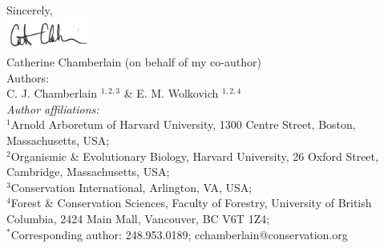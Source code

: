 \documentclass[11pt,a4paper]{article}\usepackage[]{graphicx}\usepackage[]{color}
\begin{document}
\vspace{1.5ex}
\noindent Sincerely, \\
\includegraphics[width=0.2\textwidth]{full_signature.jpg} \\
\noindent Catherine Chamberlain (on behalf of my co-author)
\vspace{2ex}\\
\noindent Authors:\\
C. J. Chamberlain $^{1,2,3}$ \& E. M. Wolkovich $^{1,2,4}$
\vspace{2ex}\\
\emph{Author affiliations:}\\
$^{1}$Arnold Arboretum of Harvard University, 1300 Centre Street, Boston, Massachusetts, USA; \\
$^{2}$Organismic \& Evolutionary Biology, Harvard University, 26 Oxford Street, Cambridge, Massachusetts, USA; \\
$^{3}$Conservation International, Arlington, VA, USA;\\
$^{4}$Forest \& Conservation Sciences, Faculty of Forestry, University of British Columbia, 2424 Main Mall, Vancouver, BC V6T 1Z4;\\
\vspace{2ex}
$^*$Corresponding author: 248.953.0189; cchamberlain@conservation.org
\end{document}
